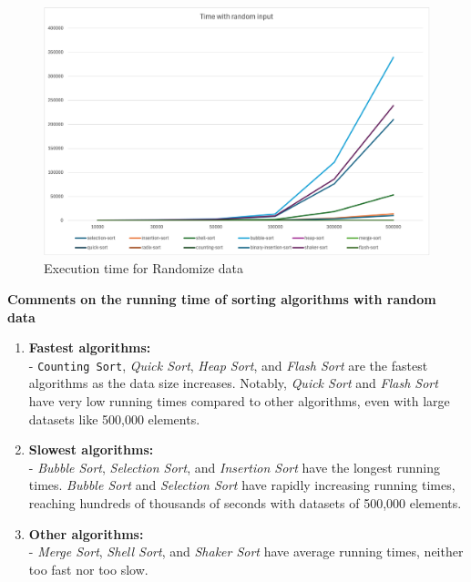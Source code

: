\begin{figure}[h]
    \centering
    \includegraphics[scale=0.65]{Figures/Visualization/Random_time.png}
    \caption{Execution time for Randomize data}
    \label{fig:enter-label}
\end{figure}

\textbf{Comments on the running time of sorting algorithms with random data}
\begin{enumerate}
    \item \textbf{Fastest algorithms:} \\
   - \texttt{Counting Sort}, \textit{Quick Sort}, \textit{Heap Sort}, and \textit{Flash Sort} are the fastest algorithms as the data size increases. Notably, \textit{Quick Sort} and \textit{Flash Sort} have very low running times compared to other algorithms, even with large datasets like 500,000 elements.

    \item \textbf{Slowest algorithms:} \\
   - \textit{Bubble Sort}, \textit{Selection Sort}, and \textit{Insertion Sort} have the longest running times. \textit{Bubble Sort} and \textit{Selection Sort} have rapidly increasing running times, reaching hundreds of thousands of seconds with datasets of 500,000 elements.

    \item \textbf{Other algorithms:} \\
   - \textit{Merge Sort}, \textit{Shell Sort}, and \textit{Shaker Sort} have average running times, neither too fast nor too slow.
\end{enumerate}

